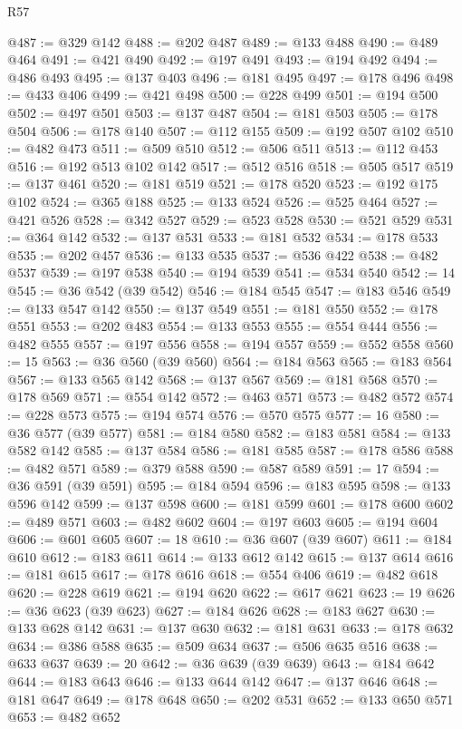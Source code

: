 \begin{lexlean}{R57}
\begin{coremodule}
@487 := @329 @142
@488 := @202 @487
@489 := @133 @488
@490 := @489 @464
@491 := @421 @490
@492 := @197 @491
@493 := @194 @492
@494 := @486 @493
@495 := @137 @403
@496 := @181 @495
@497 := @178 @496
@498 := @433 @406
@499 := @421 @498
@500 := @228 @499
@501 := @194 @500
@502 := @497 @501
@503 := @137 @487
@504 := @181 @503
@505 := @178 @504
@506 := @178 @140
@507 := @112 @155
@509 := @192 @507 @102
@510 := @482 @473
@511 := @509 @510
@512 := @506 @511
@513 := @112 @453
@516 := @192 @513 @102 @142
@517 := @512 @516
@518 := @505 @517
@519 := @137 @461
@520 := @181 @519
@521 := @178 @520
@523 := @192 @175 @102
@524 := @365 @188
@525 := @133 @524
@526 := @525 @464
@527 := @421 @526
@528 := @342 @527
@529 := @523 @528
@530 := @521 @529
@531 := @364 @142
@532 := @137 @531
@533 := @181 @532
@534 := @178 @533
@535 := @202 @457
@536 := @133 @535
@537 := @536 @422
@538 := @482 @537
@539 := @197 @538
@540 := @194 @539
@541 := @534 @540
@542 := 14
@545 := @36 @542 (@39 @542)
@546 := @184 @545
@547 := @183 @546
@549 := @133 @547 @142
@550 := @137 @549
@551 := @181 @550
@552 := @178 @551
@553 := @202 @483
@554 := @133 @553
@555 := @554 @444
@556 := @482 @555
@557 := @197 @556
@558 := @194 @557
@559 := @552 @558
@560 := 15
@563 := @36 @560 (@39 @560)
@564 := @184 @563
@565 := @183 @564
@567 := @133 @565 @142
@568 := @137 @567
@569 := @181 @568
@570 := @178 @569
@571 := @554 @142
@572 := @463 @571
@573 := @482 @572
@574 := @228 @573
@575 := @194 @574
@576 := @570 @575
@577 := 16
@580 := @36 @577 (@39 @577)
@581 := @184 @580
@582 := @183 @581
@584 := @133 @582 @142
@585 := @137 @584
@586 := @181 @585
@587 := @178 @586
@588 := @482 @571
@589 := @379 @588
@590 := @587 @589
@591 := 17
@594 := @36 @591 (@39 @591)
@595 := @184 @594
@596 := @183 @595
@598 := @133 @596 @142
@599 := @137 @598
@600 := @181 @599
@601 := @178 @600
@602 := @489 @571
@603 := @482 @602
@604 := @197 @603
@605 := @194 @604
@606 := @601 @605
@607 := 18
@610 := @36 @607 (@39 @607)
@611 := @184 @610
@612 := @183 @611
@614 := @133 @612 @142
@615 := @137 @614
@616 := @181 @615
@617 := @178 @616
@618 := @554 @406
@619 := @482 @618
@620 := @228 @619
@621 := @194 @620
@622 := @617 @621
@623 := 19
@626 := @36 @623 (@39 @623)
@627 := @184 @626
@628 := @183 @627
@630 := @133 @628 @142
@631 := @137 @630
@632 := @181 @631
@633 := @178 @632
@634 := @386 @588
@635 := @509 @634
@637 := @506 @635 @516
@638 := @633 @637
@639 := 20
@642 := @36 @639 (@39 @639)
@643 := @184 @642
@644 := @183 @643
@646 := @133 @644 @142
@647 := @137 @646
@648 := @181 @647
@649 := @178 @648
@650 := @202 @531
@652 := @133 @650 @571
@653 := @482 @652

\end{coremodule}
\end{lexlean}
